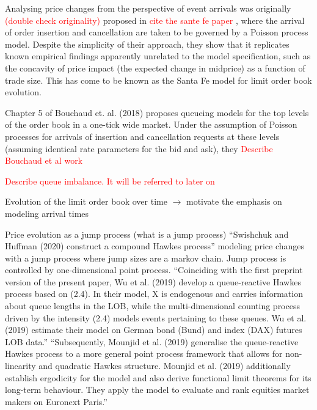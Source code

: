 \documentclass[honours,12pt]{unswthesis}
\numberwithin{equation}{section}
\begin{document}
Analysing price changes from the perspective of event arrivals was originally \textcolor{red}{(double check originality)} proposed in \textcolor{red}{cite the sante fe paper}
, where the arrival of order insertion and cancellation are taken to be governed by a Poisson process model. Despite the simplicity of their approach, they show that it replicates known empirical findings apparently unrelated to the model specification, such as the concavity of price impact (the expected change in midprice) as a function of trade size. This has come to be known as the Santa Fe model for limit order book evolution.

Chapter 5 of Bouchaud et. al. (2018) proposes queueing models for the top levels of the order book in a one-tick wide market. Under the assumption of Poisson processes for arrivals of insertion and cancellation requests at these levels (assuming identical rate parameters for the bid and ask), they 
\textcolor{red}{Describe Bouchaud et al work}
\cite{BouchaudEtAl}

\textcolor{red}{Describe queue imbalance. It will be referred to later on}

Evolution of the limit order book over time $\to$ motivate the emphasis on modeling arrival times

Price evolution as a jump process (what is a jump process)
``Swishchuk and Huffman (2020) construct a compound Hawkes process'' modeling price changes with a jump process where jump sizes are a markov chain. Jump process is controlled by one-dimensional point process.
``Coinciding with the first preprint version of the present paper, Wu et al. (2019) develop a queue-reactive Hawkes process based on (2.4). In their model, X is endogenous and carries information about queue lengths in the LOB, while the multi-dimensional counting process driven by the intensity (2.4) models events pertaining to these queues. Wu et al. (2019) estimate their model on German bond (Bund) and index (DAX) futures LOB data.''
``Subsequently, Mounjid et al. (2019) generalise the queue-reactive Hawkes process to a more general point process framework that allows for non-linearity and quadratic Hawkes structure.  Mounjid et al. (2019) additionally establish ergodicity for the model and also derive functional limit theorems for its long-term behaviour. They apply the model to evaluate and rank equities market makers on Euronext Paris.''
\end{document}
